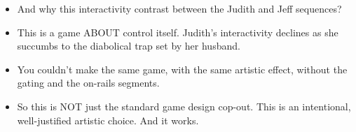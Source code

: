 \documentclass[12pt]{article}
\begin{document}
{\begin{itemize}
\item And why this interactivity contrast between the Judith and Jeff sequences?

\item This is a game ABOUT control itself.  Judith's interactivity declines as she succumbs to the diabolical trap set by her husband.  

\item You couldn't make the same game, with the same artistic effect, without the gating and the on-rails segments. 

\item So this is NOT just the standard game design cop-out.  This is an intentional, well-justified artistic choice.  And it works.  

\end{itemize}
}
\end{document}
